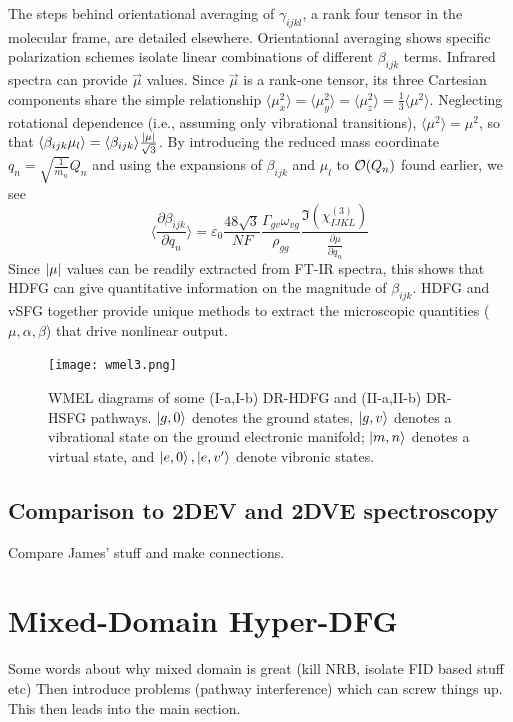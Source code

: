 \documentclass[aip, jcp, reprint, onecolumn]{revtex4-2}
\begin{document}
The steps behind orientational averaging of $\gamma_{ijkl}$, a rank four tensor in the molecular frame, are detailed elsewhere.\cite{Andrews1977, McDonnell2024}
Orientational averaging shows specific polarization schemes isolate linear combinations of different $\beta_{ijk}$ terms. 
Infrared spectra can provide $\vec{\mu}$ values.
Since $\vec{\mu}$ is a rank-one tensor, its three Cartesian components share the simple relationship $\langle {\mu^2_x} \rangle = \langle {\mu^2_y} \rangle = \langle {\mu^2_z} \rangle = \frac{1}{3}\langle {\mu^2} \rangle$. \cite{RN459}
Neglecting rotational dependence (i.e., assuming only vibrational transitions), $\langle {\mu^2} \rangle = \mu^2$, so that $\langle \beta_{ijk} \mu_l \rangle = \langle \beta_{ijk} \rangle \frac{\abs{\mu}}{\sqrt{3}}$.
By introducing the reduced mass coordinate $q_n = \sqrt{\frac{1}{m_n}} Q_n$ and using the expansions of $\beta_{ijk}$ and $\mu_{l}$ to $\order{Q_n}$ found earlier, we see
\begin{equation}\label{betasive}
	\langle \frac{\partial \beta_{ijk}}{\partial q_n} \rangle = \varepsilon_0 \frac{48 \sqrt{3} }{NF}  \frac{\Gamma_{gv} \omega_{vg}}{\rho_{gg}} \frac{\Im(\chi^{(3)}_{IJKL})}{\frac{\partial \mu}{\partial q_n}}
\end{equation}
Since $\abs{\mu}$ values can be readily extracted from FT-IR spectra,\cite{RN412} this shows that HDFG can give quantitative information on the magnitude of $\beta_{ijk}$.
HDFG and vSFG together provide unique methods to extract the microscopic quantities ($\mu, \alpha, \beta$) that drive nonlinear output.

\begin{figure}[!htbp]
	\centering
	\texttt{[image: wmel3.png]}
	\caption{WMEL diagrams of some (I-a,I-b) DR-HDFG and (II-a,II-b) DR-HSFG pathways. $\ket{g,0}$ denotes the ground states, $\ket{g,v}$ denotes a vibrational state on the ground electronic manifold; $\ket{m,n}$ denotes a virtual state, and $\ket{e,0}, \ket{e,v'}$ denote vibronic states.}
	\label{fig:doubsive}
\end{figure}



\subsection{Comparison to 2DEV and 2DVE spectroscopy}
Compare James' stuff and make connections.


\section{Mixed-Domain Hyper-DFG}
Some words about why mixed domain is great (kill NRB, isolate FID based stuff etc)
Then introduce problems (pathway interference) which can screw things up. This then leads into the main section.
\end{document}
